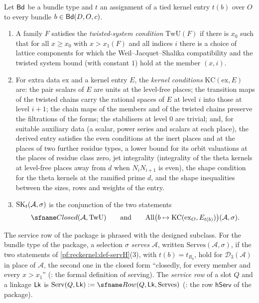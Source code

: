 \begin{definition}\label{pf:reckernel:def-servH}
Let $\mathsf{Bd}$ be a bundle type and $t$ an assignment of a tied kernel entry $t(b)$ over $O$ to every bundle
$b\in\mathsf{Bd}(D,O,c)$.
\begin{enumerate}
\item A family $F$ satisfies the \emph{twisted-system condition} $\mathrm{TwU}(F)$ if there is $x_0$ such that for all
  $x\ge x_0$ with $x>x_1(F)$ and all indices $i$ there is a choice of lattice components for which the
  Weil--Jacquet--Shalika compatibility and the twisted system bound (with constant $1$) hold at the member $(x,i)$.
\item For extra data $\mathrm{ex}$ and a kernel entry $E$, the \emph{kernel conditions} $\mathrm{KC}(\mathrm{ex},E)$ are:
  the pair scalars of $E$ are units at the level-free places; the transition maps of the twisted chains carry the
  rational spaces of $E$ at level $i$ into those at level $i+1$; the chain maps of the members and of the twisted
  chains preserve the filtrations of the forms; the stabilisers at level $0$ are trivial; and, for suitable auxiliary
  data (a scalar, power series and scalars at each place), the derived entry satisfies the even conditions at the
  inert places and at the places of two further residue types, a lower bound for its orbit valuations at the places of
  residue class zero, jet integrality (integrality of the theta kernels at level-free places away from $d$ when
  $N_iN_{i+1}$ is even), the shape condition for the theta kernels at the ramified prime $d$, and the shape
  inequalities between the sizes, rows and weights of the entry.
\item $\mathrm{SK}_t(\mathcal A,\sigma)$ is the conjunction of the two statements
  \[
  \reckClosed(\mathcal A,\mathrm{TwU})\qquad\text{and}\qquad
  \reckAtAll\bigl(b\mapsto\mathrm{KC}(\mathrm{ex}_O,E_{t(b)})\bigr)(\mathcal A,\sigma).
  \]
\end{enumerate}
\end{definition}

The service row of the package is phrased with the designed subclass. For the bundle type of the package, a selection
$\sigma$ \emph{serves} $\mathcal A$, written $\mathrm{Serves}(\mathcal A,\sigma)$, if the two statements of
\cref{pf:reckernel:def-servH}(3), with $t(b)=t_{R_b}$, hold for $\mathcal D_3(\mathcal A)$ in place of $\mathcal A$,
the second one in the closed form ``closedly, for every member and every $x>x_1$''
(: the formal definition of serving). The \emph{service row} of a slot $Q$
and a linkage $\mathsf{Lk}$ is $\mathrm{Serv}(Q,\reckLk):=\reckRow(Q,\reckLk,\mathrm{Serves})$
(: the row $\mathsf{hServ}$ of the package).

